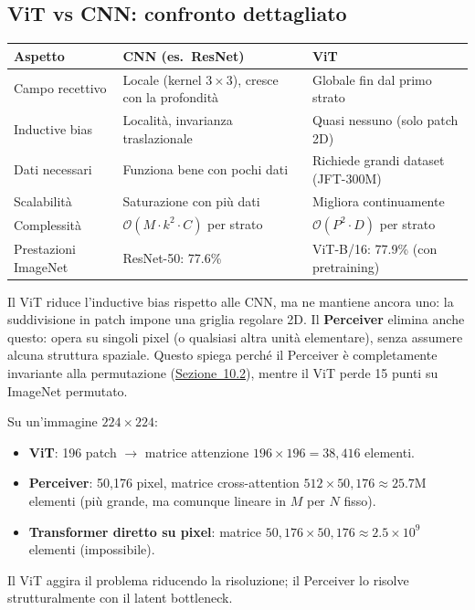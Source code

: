 \documentclass[12pt,a4paper]{article}
\begin{document}
\subsection{ViT vs CNN: confronto dettagliato}

\begin{center}
\begin{tabular}{@{}p{3cm}p{5cm}p{5cm}@{}}
\toprule
\textbf{Aspetto} & \textbf{CNN (es.\ ResNet)} & \textbf{ViT} \\
\midrule
Campo recettivo & Locale (kernel $3{\times}3$), cresce con la profondit\`a & Globale fin dal primo strato \\
Inductive bias & Localit\`a, invarianza traslazionale & Quasi nessuno (solo patch 2D) \\
Dati necessari & Funziona bene con pochi dati & Richiede grandi dataset (JFT-300M) \\
Scalabilit\`a & Saturazione con pi\`u dati & Migliora continuamente \\
Complessit\`a & $\mathcal{O}(M \cdot k^2 \cdot C)$ per strato & $\mathcal{O}(P^2 \cdot D)$ per strato \\
Prestazioni ImageNet & ResNet-50: 77.6\% & ViT-B/16: 77.9\% (con pretraining) \\
\bottomrule
\end{tabular}
\end{center}

\begin{notabox}[title={ViT, Perceiver e inductive bias}]
Il ViT riduce l'inductive bias rispetto alle CNN, ma ne mantiene ancora uno: la suddivisione in patch impone una griglia regolare 2D. Il \textbf{Perceiver} elimina anche questo: opera su singoli pixel (o qualsiasi altra unit\`a elementare), senza assumere alcuna struttura spaziale. Questo spiega perch\'e il Perceiver \`e completamente invariante alla permutazione (\hyperref[sec:imagenet_perm]{Sezione~10.2}), mentre il ViT perde 15 punti su ImageNet permutato.
\end{notabox}

\begin{examplebox}
Su un'immagine $224 \times 224$:
\begin{itemize}
    \item \textbf{ViT}: 196 patch $\to$ matrice attenzione $196 \times 196 = 38{,}416$ elementi.
    \item \textbf{Perceiver}: 50{,}176 pixel, matrice cross-attention $512 \times 50{,}176 \approx 25.7$M elementi (pi\`u grande, ma comunque lineare in $M$ per $N$ fisso).
    \item \textbf{Transformer diretto su pixel}: matrice $50{,}176 \times 50{,}176 \approx 2.5 \times 10^9$ elementi (impossibile).
\end{itemize}
Il ViT aggira il problema riducendo la risoluzione; il Perceiver lo risolve strutturalmente con il latent bottleneck.
\end{examplebox}
\end{document}

